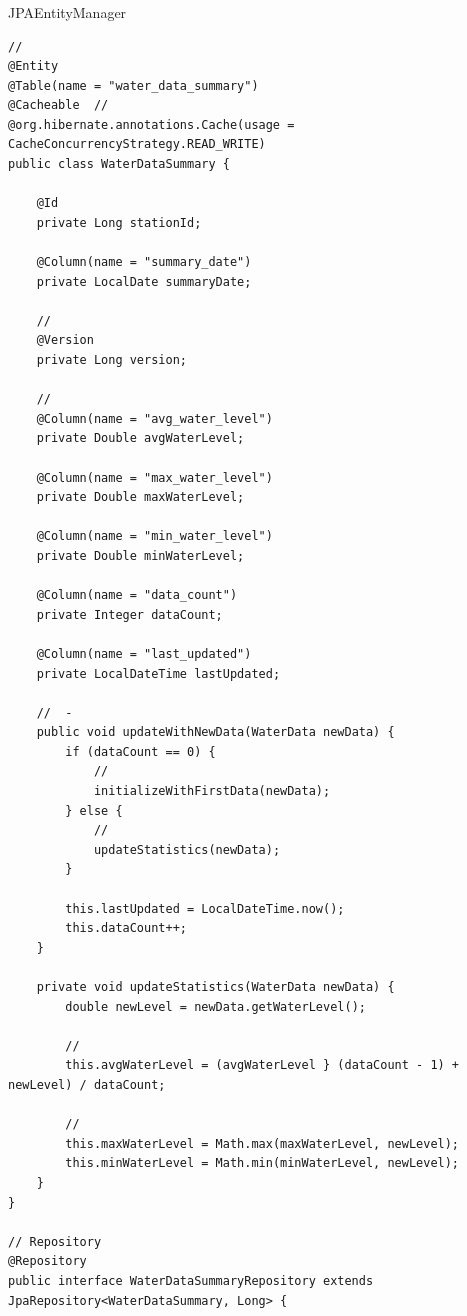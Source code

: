 \hypertarget{section-70}{%
\subsubsection{}\label{section-70}}

\important{}

\important{}JPAEntityManager

\important{}

\begin{lstlisting}[style=java]
// 
@Entity
@Table(name = "water_data_summary")
@Cacheable  // 
@org.hibernate.annotations.Cache(usage = CacheConcurrencyStrategy.READ_WRITE)
public class WaterDataSummary {
    
    @Id
    private Long stationId;
    
    @Column(name = "summary_date")
    private LocalDate summaryDate;
    
    // 
    @Version
    private Long version;
    
    // 
    @Column(name = "avg_water_level")
    private Double avgWaterLevel;
    
    @Column(name = "max_water_level")
    private Double maxWaterLevel;
    
    @Column(name = "min_water_level") 
    private Double minWaterLevel;
    
    @Column(name = "data_count")
    private Integer dataCount;
    
    @Column(name = "last_updated")
    private LocalDateTime lastUpdated;
    
    //  - 
    public void updateWithNewData(WaterData newData) {
        if (dataCount == 0) {
            // 
            initializeWithFirstData(newData);
        } else {
            // 
            updateStatistics(newData);
        }
        
        this.lastUpdated = LocalDateTime.now();
        this.dataCount++;
    }
    
    private void updateStatistics(WaterData newData) {
        double newLevel = newData.getWaterLevel();
        
        // 
        this.avgWaterLevel = (avgWaterLevel } (dataCount - 1) + newLevel) / dataCount;
        
        // 
        this.maxWaterLevel = Math.max(maxWaterLevel, newLevel);
        this.minWaterLevel = Math.min(minWaterLevel, newLevel);
    }
}

// Repository
@Repository
public interface WaterDataSummaryRepository extends JpaRepository<WaterDataSummary, Long> {
    

\end{lstlisting}
